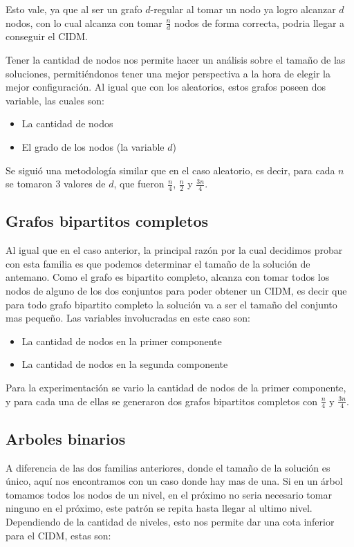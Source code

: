 Esto vale, ya que al ser un grafo $d$-regular al tomar un nodo ya logro alcanzar $d$ nodos, con lo cual alcanza con tomar $\frac{n}{d}$ nodos de forma correcta, podria llegar a conseguir el CIDM.

Tener la cantidad de nodos nos permite hacer un análisis sobre el tamaño de las soluciones, permitiéndonos tener una mejor perspectiva a la hora de elegir la mejor configuración. Al igual que con los aleatorios, estos grafos poseen dos variable, las cuales son:

\begin{itemize}
	\item La cantidad de nodos
	\item El grado de los nodos (la variable $d$)
\end{itemize}
	
Se siguió una metodología similar que en el caso aleatorio, es decir, para cada $n$ se tomaron 3 valores de $d$, que fueron $\frac{n}{4}$, $\frac{n}{2}$ y $\frac{3n}{4}$.

\subsection{Grafos bipartitos completos}

Al igual que en el caso anterior, la principal razón por la cual decidimos probar con esta familia es que podemos determinar el tamaño de la solución de antemano. Como el grafo es bipartito completo, alcanza con tomar todos los nodos de alguno de los dos conjuntos para poder obtener un CIDM, es decir que para todo grafo bipartito completo la solución va a ser el tamaño del conjunto mas pequeño. Las variables involucradas en este caso son:

\begin{itemize}
	\item La cantidad de nodos en la primer componente
	\item La cantidad de nodos en la segunda componente
\end{itemize}

Para la experimentación se vario la cantidad de nodos de la primer componente, y para cada una de ellas se generaron dos grafos bipartitos completos con $\frac{n}{4}$ y $\frac{3n}{4}$.

\subsection{Arboles binarios}

A diferencia de las dos familias anteriores, donde el tamaño de la solución es único, aquí nos encontramos con un caso donde hay mas de una. Si en un árbol tomamos todos los nodos de un nivel, en el próximo no seria necesario tomar ninguno en el próximo, este patrón se repita hasta llegar al ultimo nivel. Dependiendo de la cantidad de niveles, esto nos permite dar una cota inferior para el CIDM, estas son:

